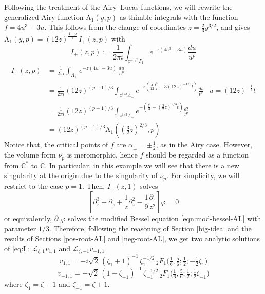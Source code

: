 \documentclass{article}
\newcommand{\C}{\mathbb{C}}
\newcommand{\laplace}{\mathcal{L}}
\theoremstyle{definition}
\theoremstyle{plain}
\newenvironment{verify}{\color{ForestGreen}}{\color{black}}
\begin{document}
Following the treatment of the Airy--Lucas functions, we will rewrite the generalized Airy function $\mathrm{A}_1(y,p)$ as thimble integrals with the function $f=4u^3-3u$. This follows from the change of coordinates $z=\tfrac{2}{3}y^{3/2}$, and gives $\mathrm{A}_1(y,p) = (12 z)^{\tfrac{1-p}{3}}\, I_+(z,p)$ with 
%
\[I_+(z,p):=\frac{1}{2\pi i}\int_{z^{-1/3}\Gamma_1} e^{-z(4u^3-3u)} \frac{du}{u^p}\]
%
\begin{verify}
  \begin{align*}
I_{+}(z,p)&=\frac{1}{2\pi i}\int_{\Lambda_{+}}e^{-z(4u^3-3u)}\, \frac{du}{u^p} &\\
&=\frac{1}{2\pi i}(12 z)^{(p-1)/3}\int_{z^{1/3}\Lambda_{+}}e^{-z(\tfrac{4}{12}\tfrac{t^3}{z}-3 (12 z)^{-1/3}t)}\frac{dt}{t^p} & u=(12 z)^{-\tfrac{1}{3}}t\\
&=\frac{1}{2\pi i}(12 z)^{(p-1)/3}\int_{z^{1/3}\Lambda_{+}}e^{-\left(\frac{t^3}{3}-(\tfrac{3}{2} z)^{2/3}t\right)}\frac{dt}{t^p} & \\
&=(12 z)^{(p-1)/3}\mathrm{A}_1((\tfrac{3}{2}z)^{2/3},p)
\end{align*}  
\end{verify}
%
Notice that, the critical points of $f$ are $\alpha_{\pm}=\pm\tfrac{1}{2}$, as in the Airy case. However, the volume form $\nu_p$ is meromorphic, hence $f$ should be regarded as a function from $\C^*$ to $\C$. In particular, in this example we will see that there is a new singularity at the origin due to the singularity of $\nu_p$. For simplicity, we will restrict to the case $p=1$. Then, $I_+(z,1)$ solves
\begin{equation}\label{eq:I}
\left[\partial_z^3-\partial_z+\frac{1}{z}\partial_z^2-\frac{1}{9}\frac{\partial_z}{z^2}\right]\varphi=0
\end{equation}
or equivalently, $\partial_z\varphi$ solves the modified Bessel equation \eqref{eqn:mod-bessel-AL} with parameter $1/3$. Therefore, following the reasoning of Section \ref{big-idea} and the results of Sections \ref{pos-root-AL} and \ref{neg-root-AL}, we get two analytic solutions of \eqref{eq:I}: $\laplace_{\zeta,1}v_{1,1}$ and $\laplace_{\zeta,-1}v_{-1,1}$ 
\[ v_{1,1}=-i\sqrt{2}\, (\zeta_1+1)^{-1}\, \zeta_1^{-1/2}\, {}_2F_1\Big(\tfrac{1}{6},\tfrac{5}{6};\tfrac{1}{2};-\tfrac{1}{2}\zeta_{1}\Big)\]
\[ v_{-1,1}=-\sqrt{2}\, (1-\zeta_{-1})^{-1}\, \zeta_{-1}^{-1/2}\, {}_2F_1\Big(\tfrac{1}{6},\tfrac{5}{6};\tfrac{1}{2};\tfrac{1}{2}\zeta_{-1}\Big)\]
where $\zeta_1=\zeta-1$ and $\zeta_{-1}=\zeta+1$. 
\end{document}
